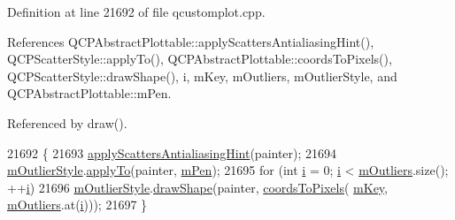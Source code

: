 Definition at line 21692 of file qcustomplot.\+cpp.



References Q\+C\+P\+Abstract\+Plottable\+::apply\+Scatters\+Antialiasing\+Hint(), Q\+C\+P\+Scatter\+Style\+::apply\+To(), Q\+C\+P\+Abstract\+Plottable\+::coords\+To\+Pixels(), Q\+C\+P\+Scatter\+Style\+::draw\+Shape(), i, m\+Key, m\+Outliers, m\+Outlier\+Style, and Q\+C\+P\+Abstract\+Plottable\+::m\+Pen.



Referenced by draw().


\begin{DoxyCode}
21692                                                               \{
21693   \hyperlink{class_q_c_p_abstract_plottable_a753272ee225a62827e90c3e1e78de4b1}{applyScattersAntialiasingHint}(painter);
21694   \hyperlink{class_q_c_p_statistical_box_ae102e4187e1e6ba1f2df0f622b5171a4}{mOutlierStyle}.\hyperlink{class_q_c_p_scatter_style_a81817dfd404635f211e6ff2a04657d36}{applyTo}(painter, \hyperlink{class_q_c_p_abstract_plottable_a67bc0622fd1b9fa14e54c14922dcec66}{mPen});
21695   \textcolor{keywordflow}{for} (\textcolor{keywordtype}{int} \hyperlink{_comparision_pictures_2_createtest_image_8m_a6f6ccfcf58b31cb6412107d9d5281426}{i} = 0; \hyperlink{_comparision_pictures_2_createtest_image_8m_a6f6ccfcf58b31cb6412107d9d5281426}{i} < \hyperlink{class_q_c_p_statistical_box_a415e2f77a89396c2af999afe027bdf6c}{mOutliers}.size(); ++\hyperlink{_comparision_pictures_2_createtest_image_8m_a6f6ccfcf58b31cb6412107d9d5281426}{i})
21696     \hyperlink{class_q_c_p_statistical_box_ae102e4187e1e6ba1f2df0f622b5171a4}{mOutlierStyle}.\hyperlink{class_q_c_p_scatter_style_a992d531ac471ec2b29bdec6aeb400a06}{drawShape}(painter, \hyperlink{class_q_c_p_abstract_plottable_ade710a776104b14c1c835168ce1bfc5c}{coordsToPixels}(
      \hyperlink{class_q_c_p_statistical_box_a86fd1d3be5c5bc11d11eda7517069af4}{mKey}, \hyperlink{class_q_c_p_statistical_box_a415e2f77a89396c2af999afe027bdf6c}{mOutliers}.at(\hyperlink{_comparision_pictures_2_createtest_image_8m_a6f6ccfcf58b31cb6412107d9d5281426}{i})));
21697 \}
\end{DoxyCode}


